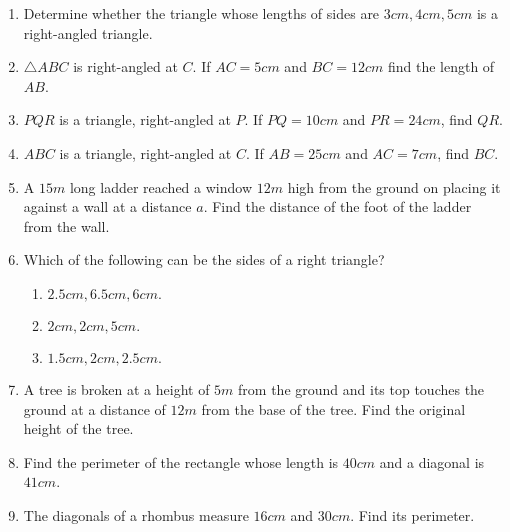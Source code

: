 \begin{enumerate}[label=\thesection.\arabic*, ref=\thesection.\theenumi]
\item Determine whether the triangle whose lengths of sides are $3 cm, 4 cm, 5 cm$ is a right-angled triangle.
\item $\triangle ABC$ is right-angled at $C$. If $AC = 5 cm$ and $BC = 12 cm$ find the length of $AB$.
\item $PQR$ is a triangle, right-angled at $P$. If $PQ = 10cm$ and $PR = 24 cm$, find $QR$.
\item $ABC$ is a triangle, right-angled at $C$. If $AB = 25 cm$ and $AC = 7 cm$, find $BC$.
\item A $15 m$ long ladder reached a window $12 m$ high from the ground on placing it against a wall at a distance $a$. Find the distance of the foot of the ladder from the wall.
\item  Which of the following can be the sides of a right triangle? 
\begin{enumerate}
	\item $2.5 cm,6.5 cm, 6 cm.$ 
	\item $ 2 cm, 2 cm, 5 cm.$ 
	\item $ 1.5 cm, 2cm, 2.5 cm.$
\end{enumerate}
\item A tree is broken at a height of $5 m$ from the ground and its top touches the ground at a distance of $12 m$ from the base of the tree. Find the original height of the tree.
\item Find the perimeter of the rectangle whose length is $40 cm$ and a diagonal is $41 cm$. 
\item The diagonals of a rhombus measure $16 cm$ and $30 cm$. Find its perimeter.
		\end{enumerate}
